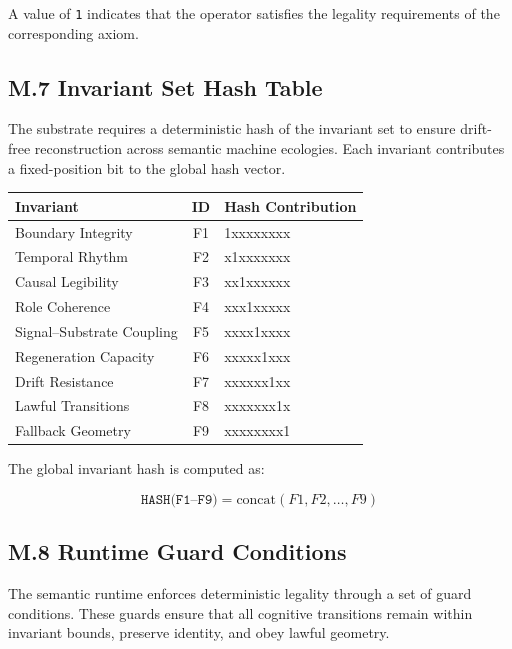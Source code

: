 A value of \texttt{1} indicates that the operator satisfies the legality
requirements of the corresponding axiom.

\subsection*{M.7 Invariant Set Hash Table}

The substrate requires a deterministic hash of the invariant set to ensure
drift-free reconstruction across semantic machine ecologies. Each invariant
contributes a fixed-position bit to the global hash vector.

\begin{center}
\begin{tabular}{lcl}
\toprule
\textbf{Invariant} & \textbf{ID} & \textbf{Hash Contribution} \\
\midrule
Boundary Integrity              & F1 & 1xxxxxxxx \\
Temporal Rhythm                 & F2 & x1xxxxxxx \\
Causal Legibility               & F3 & xx1xxxxxx \\
Role Coherence                  & F4 & xxx1xxxxx \\
Signal–Substrate Coupling       & F5 & xxxx1xxxx \\
Regeneration Capacity           & F6 & xxxxx1xxx \\
Drift Resistance                & F7 & xxxxxx1xx \\
Lawful Transitions              & F8 & xxxxxxx1x \\
Fallback Geometry               & F9 & xxxxxxxx1 \\
\bottomrule
\end{tabular}
\end{center}

The global invariant hash is computed as:



\[
\texttt{HASH(F1–F9)} = \text{concat}(F1, F2, \ldots, F9)
\]



\subsection*{M.8 Runtime Guard Conditions}

The semantic runtime enforces deterministic legality through a set of guard
conditions. These guards ensure that all cognitive transitions remain within
invariant bounds, preserve identity, and obey lawful geometry.

